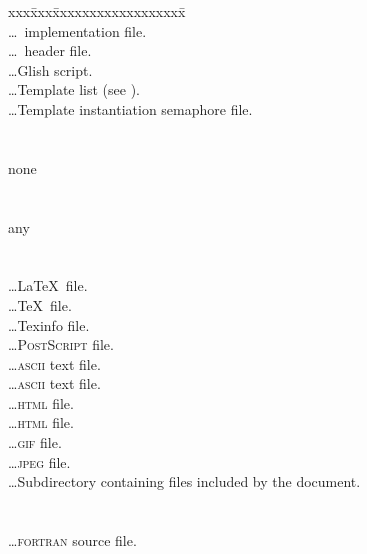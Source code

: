 \begin{tabbing}
xxx\=xxx\=xxxxxxxxxxxxxxxxxx\=\+\kill
   \+\\
                    \>\ldots \cplusplus\ implementation file.\\
                     \>\ldots \cplusplus\ header file.\\
                     \>\ldots Glish script.\\
              \>\ldots Template list (see ).\\
        \>\ldots Template instantiation semaphore file.\\
\-\\
   \+\\
      none\\
\-\\
   \+\\
      any\\
\-\\
   \+\\
                 \>\ldots \LaTeX\ file.\\
                   \>\ldots \TeX\ file.\\
                  \>\ldots Texinfo file.\\
                    \>\ldots \textsc{PostScript} file.\\
                  \>\ldots \textsc{ascii} text file.\\
                   \>\ldots \textsc{ascii} text file.\\
                  \>\ldots \textsc{html} file.\\
                   \>\ldots \textsc{html} file.\\
                   \>\ldots \textsc{gif} file.\\
                   \>\ldots \textsc{jpeg} file.\\
                   \>\ldots Subdirectory containing files included
                              by the document.\\
\-\\
   \+\\
                     \>\ldots \textsc{fortran} source file.\\
\-\\
   \+\\

\end{tabbing}
